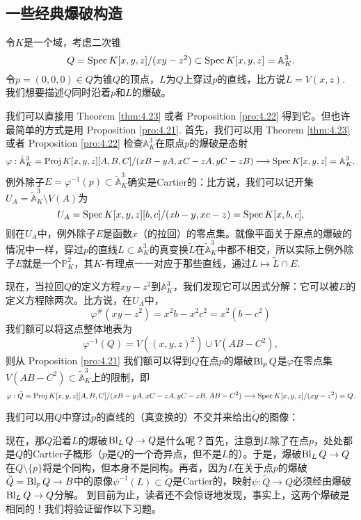 \subsection{一些经典爆破构造}\label{s:4.2.2}

\begin{exa}\label{exa:4.27}
	令$K$是一个域，考虑二次锥
	\[
		Q=\operatorname{Spec} K[x,y,z]/(xy-z^2)\subset \operatorname{Spec} K[x,y,z]=\mathbb A_K^3.
	\]
	令$p=(0,0,0)\in Q$为锥$Q$的顶点，$L$为$Q$上穿过$p$的直线，比方说$L=V(x,z)$. 我们想要描述$Q$同时沿着$p$和$L$的爆破。
\end{exa}

我们可以直接用 Theorem \ref{thm:4.23} 或者 Proposition \ref{pro:4.22} 得到它。但也许最简单的方式是用 Proposition \ref{pro:4.21}. 首先，我们可以用 Theorem \ref{thm:4.23} 或者 Proposition \ref{pro:4.22} 检查$\mathbb A_K^3$在原点$p$的爆破是态射
\[
	\varphi:\tilde{\mathbb A}_K^3=\operatorname{Proj} K[x,y,z][A,B,C]/(xB-yA,xC-zA,yC-zB)\longrightarrow \operatorname{Spec} K[x,y,z]=\mathbb A_K^3.
\]
例外除子$E=\varphi^{-1}(p)\subset \tilde{\mathbb A}_K^3$确实是Cartier的：比方说，我们可以记开集$U_A=\tilde{\mathbb A}_K^3\setminus V(A)$为
\[
	U_A=\operatorname{Spec} K[x,y,z][b,c]/(xb-y,xc-z)=\operatorname{Spec} K[x,b,c],
\]
则在$U_A$中，例外除子$E$是函数$x$（的拉回）的零点集。就像平面关于原点的爆破的情况中一样，穿过$p$的直线$L\subset \mathbb A_K^3$的真变换$\tilde L$在$\tilde{\mathbb A}_K^3$中都不相交，所以实际上例外除子$E$就是一个$\mathbb P_K^2$，其$K$-有理点一一对应于那些直线，通过$L\mapsto \tilde L\cap E$.

现在，当拉回$Q$的定义方程$xy-z^2$到$\mathbb A_K^3$，我们发现它可以因式分解：它可以被$E$的定义方程除两次。比方说，在$U_A$中，
\[
	\varphi^\# (xy-z^2)=x^2b-x^2c^2=x^2(b-c^2)
\]
我们额可以将这点整体地表为
\[
	\varphi^{-1}(Q)=V((x,y,z)^2)\cup V(AB-C^2),
\]
则从 Proposition \ref{pro:4.21} 我们额可以得到$Q$在点$p$的爆破$\operatorname{Bl}_p Q$是$\varphi$在零点集$V(AB-C^2)\subset \tilde{\mathbb A}_K^3$上的限制，即
\[
	\varphi:\tilde Q=\operatorname{Proj} K[x,y,z][A,B,C]/(xB-yA,xC-zA,yC-zB,AB-C^2)\longrightarrow \operatorname{Spec} K[x,y,z]/(xy-z^2)=Q.
\]

我们可以用$Q$中穿过$p$的直线的（真变换的）不交并来给出$\tilde Q$的图像：


现在，那$Q$沿着$L$的爆破$\operatorname{Bl}_L Q\to Q$是什么呢？首先，注意到$L$除了在点$p$，处处都是$Q$的Cartier子概形（$p$是$Q$的一个奇异点，但不是$L$的）。于是，爆破$\operatorname{Bl}_L Q\to Q$在$Q\setminus \{p\}$将是个同构，但本身不是同构。再者，因为$L$在关于点$p$的爆破$\tilde Q=\operatorname{Bl}_pQ\to B$中的原像$\psi^{-1}(L)\subset \tilde Q$是Cartier的，映射$\psi:\tilde Q\to Q$必须经由爆破$\operatorname{Bl}_L Q\to Q$分解。
到目前为止，读者还不会惊讶地发现，事实上，这两个爆破是相同的！我们将验证留作以下习题。

